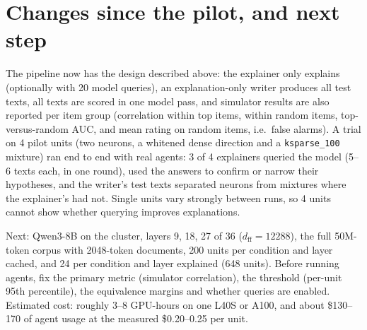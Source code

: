 \documentclass[11pt]{article}
\begin{document}
\section{Changes since the pilot, and next step}
The pipeline now has the design described above: the explainer only explains (optionally with 20 model queries), an
explanation-only writer produces all test texts, all texts are scored in one model pass, and simulator results are
also reported per item group (correlation within top items, within random items, top-versus-random AUC, and mean
rating on random items, i.e.\ false alarms). A trial on 4 pilot units (two neurons, a whitened dense direction and a
\texttt{ksparse\_100} mixture) ran end to end with real agents: 3 of 4 explainers queried the model (5--6 texts each,
in one round), used the answers to confirm or narrow their hypotheses, and the writer's test texts separated neurons
from mixtures where the explainer's had not. Single units vary strongly between runs, so 4 units cannot show whether
querying improves explanations.

Next: Qwen3-8B on the cluster, layers 9, 18, 27 of 36 ($d_{\mathrm{ff}}=12288$), the full 50M-token corpus with
2048-token documents, 200 units per condition and layer cached, and 24 per condition and layer explained (648 units).
Before running agents, fix the primary metric (simulator correlation), the threshold (per-unit 95th percentile), the
equivalence margins and whether queries are enabled. Estimated cost: roughly 3--8 GPU-hours on one L40S or A100, and
about \$130--170 of agent usage at the measured \$0.20--0.25 per unit.
\end{document}

